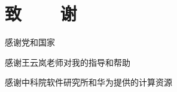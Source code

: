 \renewcommand{\baselinestretch}{1.5}
\fontsize{12pt}{13pt}\selectfont
{}
\chapter*{致~~~~谢}

感谢党和国家

感谢王云岚老师对我的指导和帮助

感谢中科院软件研究所和华为提供的计算资源

\clearpage
\endinput